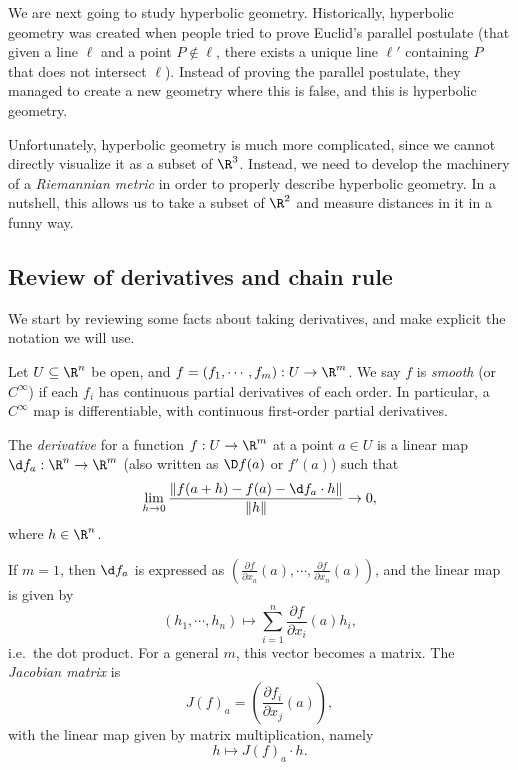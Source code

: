 \documentclass[a4paper]{article}
\begin{document}
We are next going to study hyperbolic geometry. Historically, hyperbolic geometry was created when people tried to prove Euclid's parallel postulate (that given a line $\ell$ and a point $P \not\in \ell$, there exists a unique line $\ell'$ containing $P$ that does not intersect $\ell$). Instead of proving the parallel postulate, they managed to create a new geometry where this is false, and this is hyperbolic geometry.

Unfortunately, hyperbolic geometry is much more complicated, since we cannot directly visualize it as a subset of $\R^3$. Instead, we need to develop the machinery of a \emph{Riemannian metric} in order to properly describe hyperbolic geometry. In a nutshell, this allows us to take a subset of $\R^2$ and measure distances in it in a funny way.

\subsection{Review of derivatives and chain rule}
We start by reviewing some facts about taking derivatives, and make explicit the notation we will use.

\begin{defi}
  Let $U \subseteq \R^n$ be open, and $f = (f_1, \cdots, f_m): U \to \R^m$. We say $f$ is \emph{smooth} (or $C^\infty$) if each $f_i$ has continuous partial derivatives of each order. In particular, a $C^\infty$ map is differentiable, with continuous first-order partial derivatives.
\end{defi}

\begin{defi}[Derivative]
  The \emph{derivative} for a function $f: U \to \R^m$ at a point $a \in U$ is a linear map $\d f_a: \R^n \to \R^m$ (also written as $\D f(a)$ or $f'(a)$) such that
  \[
    \lim_{h \to 0} \frac{\|f(a + h) - f(a) - \d f_a \cdot h\|}{\|h\|} \to 0,
  \]
  where $h \in \R^n$.

  If $m = 1$, then $\d f_a$ is expressed as $\left(\frac{\partial f}{\partial x_a}(a), \cdots, \frac{\partial f}{\partial x_n}(a)\right)$, and the linear map is given by
  \[
    (h_1, \cdots, h_n) \mapsto \sum_{i = 1}^n \frac{\partial f}{\partial x_i}(a) h_i,
  \]
  i.e.\ the dot product. For a general $m$, this vector becomes a matrix. The \emph{Jacobian matrix} is
  \[
    J(f)_a = \left(\frac{\partial f_i}{\partial x_j}(a)\right),
  \]
  with the linear map given by matrix multiplication, namely
  \[
    h \mapsto J(f)_a \cdot h.
  \]
\end{defi}
\end{document}
